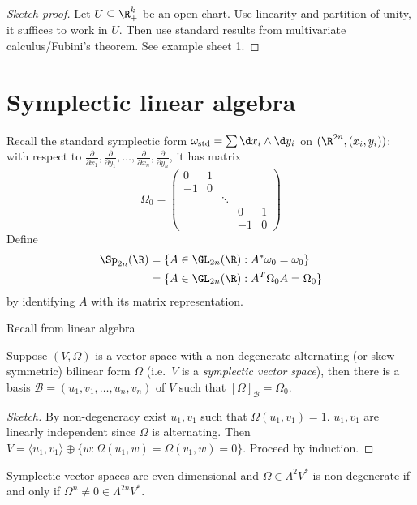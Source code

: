 \documentclass[a4paper]{article}
\newcommand{\w}{\wedge} %
\begin{document}
\begin{proof}[Sketch proof]
  Let \(U \subseteq \R^k_+\) be an open chart. Use linearity and partition of unity, it suffices to work in \(U\). Then use standard results from multivariate calculus/Fubini's theorem. See example sheet 1.
\end{proof}

\section{Symplectic linear algebra}

Recall the standard symplectic form \(\omega_{\text{std}} = \sum \d x_i \w \d y_i\) on \((\R^{2n}, (x_i, y_i))\): with respect to \(\frac{\partial  }{\partial x_1}, \frac{\partial  }{\partial y_1}, \dots, \frac{\partial  }{\partial x_n}, \frac{\partial  }{\partial y_n}\), it has matrix
\[
  \Omega_0 =
  \begin{pmatrix}
    0 & 1 \\
    -1 & 0 \\
    & & \ddots \\
    & & & 0 & 1 \\
    & & & -1 & 0
  \end{pmatrix}
\]
Define
\begin{align*}
  \Sp_{2n}(\R)
  &= \{A \in \GL_{2n}(\R): A^*\omega_0 = \omega_0\} \\
  &= \{A \in \GL_{2n}(\R): A^T\Omega_0A = \Omega_0\}
\end{align*}
by identifying \(A\) with its matrix representation.

Recall from linear algebra

\begin{lemma}
  Suppose \((V, \Omega)\) is a vector space with a non-degenerate alternating (or skew-symmetric) bilinear form \(\Omega\) (i.e.\ \(V\) is a \emph{symplectic vector space}), then there is a basis \(\mathcal B = (u_1, v_1, \dots, u_n, v_n)\) of \(V\) such that \([\Omega]_{\mathcal B} = \Omega_0\).
\end{lemma}

\begin{proof}[Sketch]
  By non-degeneracy exist \(u_1, v_1\) such that \(\Omega(u_1, v_1) = 1\). \(u_1, v_1\) are linearly independent since \(\Omega\) is alternating. Then \(V = \langle u_1, v_1 \rangle \oplus \{w: \Omega(u_1, w) = \Omega(v_1, w) = 0\}\). Proceed by induction.
\end{proof}

\begin{corollary}
  Symplectic vector spaces are even-dimensional and \(\Omega \in \Lambda^2V^*\) is non-degenerate if and only if \(\Omega^n \ne 0 \in \Lambda^{2n}V^*\).
\end{corollary}
\end{document}

